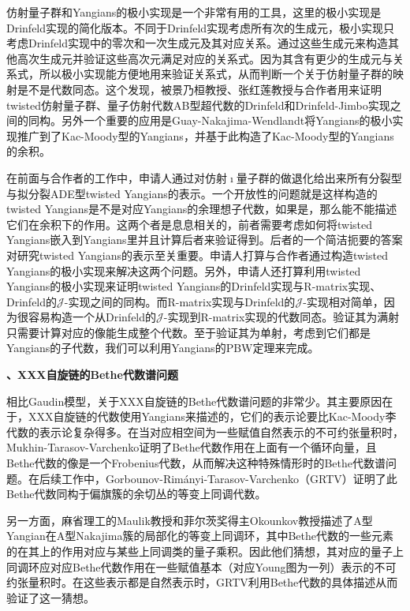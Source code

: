 \documentclass[12pt,UTF8,AutoFakeBold=4,a4paper]{ctexart}
\begin{document}
仿射量子群和Yangians的极小实现是一个非常有用的工具，这里的极小实现是Drinfeld实现的简化版本。不同于Drinfeld实现考虑所有次的生成元，极小实现只考虑Drinfeld实现中的零次和一次生成元及其对应关系。通过这些生成元来构造其他高次生成元并验证这些高次元满足对应的关系式。因为其含有更少的生成元与关系式，所以极小实现能方便地用来验证关系式，从而判断一个关于仿射量子群的映射是不是代数同态。这个发现，被景乃桓教授、张红莲教授与合作者用来证明twisted仿射量子群、量子仿射代数AB型超代数的Drinfeld和Drinfeld-Jimbo实现之间的同构。另外一个重要的应用是Guay-Nakajima-Wendlandt将Yangians的极小实现推广到了Kac-Moody型的Yangians，并基于此构造了Kac-Moody型的Yangians的余积。

在前面与合作者的工作中，申请人通过对仿射$\imath$量子群的做退化给出来所有分裂型与拟分裂ADE型twisted Yangians的表示。一个开放性的问题就是这样构造的twisted Yangians是不是对应Yangians的余理想子代数，如果是，那么能不能描述它们在余积下的作用。这两个者是息息相关的，前者需要考虑如何将twisted Yangians嵌入到Yangians里并且计算后者来验证得到。后者的一个简洁扼要的答案对研究twisted Yangians的表示至关重要。申请人打算与合作者通过构造twisted Yangians的极小实现来解决这两个问题。另外，申请人还打算利用twisted Yangians的极小实现来证明twisted Yangians的Drinfeld实现与R-matrix实现、Drinfeld的$\mathcal J$-实现之间的同构。而R-matrix实现与Drinfeld的$\mathcal J$-实现相对简单，因为很容易构造一个从Drinfeld的$\mathcal J$-实现到R-matrix实现的代数同态。验证其为满射只需要计算对应的像能生成整个代数。至于验证其为单射，考虑到它们都是Yangians的子代数，我们可以利用Yangians的PBW定理来完成。

\medskip



\textbf{、XXX自旋链的Bethe代数谱问题}

相比Gaudin模型，关于XXX自旋链的Bethe代数谱问题的非常少。其主要原因在于，XXX自旋链的代数使用Yangians来描述的，它们的表示论要比Kac-Moody李代数的表示论复杂得多。在当对应相空间为一些赋值自然表示的不可约张量积时，Mukhin-Tarasov-Varchenko证明了Bethe代数作用在上面有一个循环向量，且Bethe代数的像是一个Frobenius代数，从而解决这种特殊情形时的Bethe代数谱问题。在后续工作中，Gorbounov-Rimányi-Tarasov-Varchenko（GRTV）证明了此Bethe代数同构于偏旗簇的余切丛的等变上同调代数。

另一方面，麻省理工的Maulik教授和菲尔茨奖得主Okounkov教授描述了A型Yangian在A型Nakajima簇的局部化的等变上同调环，其中Bethe代数的一些元素的在其上的作用对应与某些上同调类的量子乘积。因此他们猜想，其对应的量子上同调环应对应Bethe代数作用在一些赋值基本（对应Young图为一列）表示的不可约张量积时。在这些表示都是自然表示时，GRTV利用Bethe代数的具体描述从而验证了这一猜想。
\end{document}
